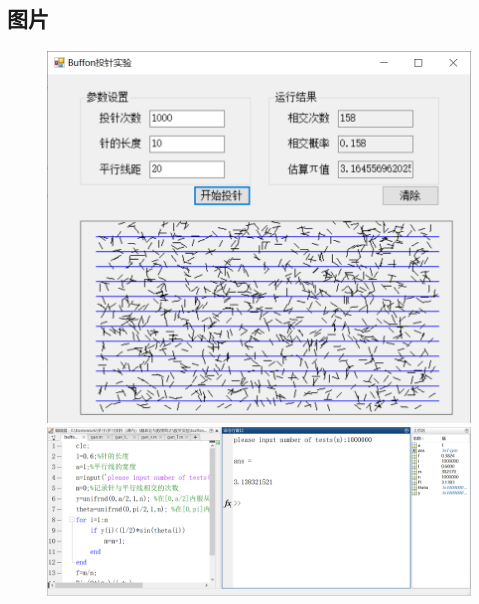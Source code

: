 \documentclass[UTF8,12pt,a4paper]{article}
\begin{document}
\subsection{图片}
\begin{figure}[!h]
	\centering
	\begin{minipage}[c]{0.45\textwidth}
		\centering
		\includegraphics[width=\linewidth, height=0.4\textheight]{gao1}
	\end{minipage}
	\quad
	\begin{minipage}[c]{0.45\textwidth}
		\centering
		\includegraphics[width=\linewidth, height=0.4\textheight]{gao2}
	\end{minipage}
\end{figure}
\end{document}
